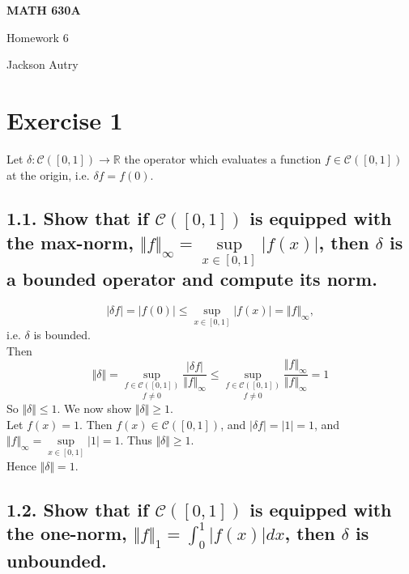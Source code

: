 \documentclass[12pt,a4paper]{article}
\author{Jackson Autry}
\newcommand{\R}{\mathbb{R}}
\theoremstyle{plain}
\theoremstyle{remark}
\theoremstyle{definition}
\begin{document}

	
\begin{center}
	\textbf{MATH 630A} %
	
		Homework 6	%
		
		Jackson Autry
\end{center}

\section*{Exercise 1}

	Let $\delta : \mathcal{C}([0,1]) \to \R$ the operator which evaluates a function $f \in \mathcal{C}([0,1])$ at the origin, i.e. $\delta f = f(0).$

\subsection*{1.1. Show that if $\mathcal{C}([0,1])$ is equipped with the max-norm, $\Vert f \Vert_{\infty} = \sup\limits_{x \in [0,1]}\vert f(x) \vert$, then $\delta$ is a bounded operator and compute its norm.}

$$\vert \delta f \vert = \vert f(0) \vert \le \sup\limits_{x \in [0,1]} \vert f(x) \vert = \Vert f \Vert_{\infty},$$
i.e. $\delta$ is bounded.\\
Then 
$$\Vert \delta \Vert = \underset{f \ne 0}{\sup\limits_{f \in \mathcal{C}([0,1])}} \frac{\vert \delta f \vert}{\Vert f \Vert_{\infty}} \le \underset{f \ne 0}{\sup\limits_{f \in \mathcal{C}([0,1])}}\frac{\Vert f \Vert_{\infty}}{\Vert f \Vert_{\infty}} = 1$$
So $\Vert \delta \Vert \le 1$. We now show $\Vert \delta \Vert \ge 1$.\\
Let $f(x) = 1$. Then $f(x) \in \mathcal{C}([0,1])$, and $\vert \delta f \vert = \vert 1 \vert =1$, and $\Vert f \Vert_{\infty} = \sup\limits_{x \in [0,1]} \vert 1 \vert = 1$. Thus $\Vert \delta \Vert \ge 1$.\\
Hence $\Vert \delta \Vert = 1$.

\subsection*{1.2. Show that if $\mathcal{C}([0,1])$ is equipped with the one-norm, $\Vert f\Vert_1 = \int_0^1 \vert f(x) \vert dx$, then $\delta$ is unbounded.}
\end{document}

